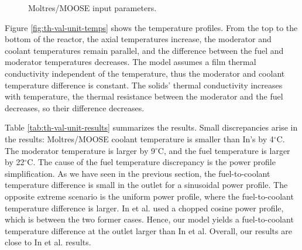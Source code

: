 \begin{figure}[htbp!]
	\centering
	\hfill
  \caption{Moltres/MOOSE input parameters.}
	\label{fig:th-val-unit-model}
\end{figure}

Figure \ref{fig:th-val-unit-temps} shows the temperature profiles.
From the top to the bottom of the reactor, the axial temperatures increase, the moderator and coolant temperatures remain parallel,
and the difference between the fuel and moderator temperatures decreases.
The model assumes a film thermal conductivity independent of the temperature, thus the moderator and coolant temperature difference is constant.
The solids' thermal conductivity increases with temperature, the thermal resistance between the moderator and the fuel decreases, so their difference decreases.

Table \ref{tab:th-val-unit-results} summarizes the results.
Small discrepancies arise in the results: Moltres/MOOSE coolant temperature is smaller than In's by 4$^{\circ}$C.
The moderator temperature is larger by 9$^{\circ}$C, and the fuel temperature is larger by 22$^{\circ}$C.
The cause of the fuel temperature discrepancy is the power profile simplification.
As we have seen in the previous section, the fuel-to-coolant temperature difference is small in the outlet for a sinusoidal power profile. 
The opposite extreme scenario is the uniform power profile, where the fuel-to-coolant temperature difference is larger.
In et al. used a chopped cosine power profile, which is between the two former cases.
Hence, our model yields a fuel-to-coolant temperature difference at the outlet larger than In et al.
Overall, our results are close to In et al. results.

